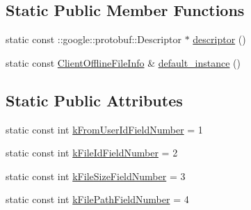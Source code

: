 \subsection*{Static Public Member Functions}
\begin{DoxyCompactItemize}
\item 
static const \+::google\+::protobuf\+::\+Descriptor $\ast$ \hyperlink{class_i_m_1_1_base_define_1_1_client_offline_file_info_acb8ce4b3a3a9bc33705005f5ed2b8c1e}{descriptor} ()
\item 
static const \hyperlink{class_i_m_1_1_base_define_1_1_client_offline_file_info}{Client\+Offline\+File\+Info} \& \hyperlink{class_i_m_1_1_base_define_1_1_client_offline_file_info_aa4881158ce06bb1df9c7790827d7ba9f}{default\+\_\+instance} ()
\end{DoxyCompactItemize}
\subsection*{Static Public Attributes}
\begin{DoxyCompactItemize}
\item 
static const int \hyperlink{class_i_m_1_1_base_define_1_1_client_offline_file_info_aced475ce5415eda255aaa838241e49fd}{k\+From\+User\+Id\+Field\+Number} = 1
\item 
static const int \hyperlink{class_i_m_1_1_base_define_1_1_client_offline_file_info_a7b4880250bd6d2b3bb84038704f29ec2}{k\+File\+Id\+Field\+Number} = 2
\item 
static const int \hyperlink{class_i_m_1_1_base_define_1_1_client_offline_file_info_a82cd9933ad625464752a268dd9fb5da8}{k\+File\+Size\+Field\+Number} = 3
\item 
static const int \hyperlink{class_i_m_1_1_base_define_1_1_client_offline_file_info_ac8294a45d765b4153b32eb048596ccb2}{k\+File\+Path\+Field\+Number} = 4
\end{DoxyCompactItemize}
